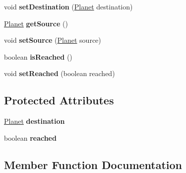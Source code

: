 \begin{DoxyCompactItemize}
void {\bfseries set\+Destination} (\mbox{\hyperlink{classfr_1_1groupe40_1_1projet_1_1model_1_1planets_1_1_planet}{Planet}} destination)
\item 
\mbox{\label{classfr_1_1groupe40_1_1projet_1_1model_1_1ships_1_1_ship_a0bad8c1701c7a6bee319ae8671228d6f}} 
\mbox{\hyperlink{classfr_1_1groupe40_1_1projet_1_1model_1_1planets_1_1_planet}{Planet}} {\bfseries get\+Source} ()
\item 
\mbox{\label{classfr_1_1groupe40_1_1projet_1_1model_1_1ships_1_1_ship_aa48b0a9238306da4fcc27a37dfc50829}} 
void {\bfseries set\+Source} (\mbox{\hyperlink{classfr_1_1groupe40_1_1projet_1_1model_1_1planets_1_1_planet}{Planet}} source)
\item 
\mbox{\label{classfr_1_1groupe40_1_1projet_1_1model_1_1ships_1_1_ship_a81d13eda5cf767c710e6d82407172d47}} 
boolean {\bfseries is\+Reached} ()
\item 
\mbox{\label{classfr_1_1groupe40_1_1projet_1_1model_1_1ships_1_1_ship_a5a3e2ba94e01cce27b168365e53e0cde}} 
void {\bfseries set\+Reached} (boolean reached)
\end{DoxyCompactItemize}
\subsection*{Protected Attributes}
\begin{DoxyCompactItemize}
\item 
\mbox{\label{classfr_1_1groupe40_1_1projet_1_1model_1_1ships_1_1_ship_a19eb504f8a0c0e263aff1e85e5e7557a}} 
\mbox{\hyperlink{classfr_1_1groupe40_1_1projet_1_1model_1_1planets_1_1_planet}{Planet}} {\bfseries destination}
\item 
\mbox{\label{classfr_1_1groupe40_1_1projet_1_1model_1_1ships_1_1_ship_abd5ae4da4bce134894098a111d7378c3}} 
boolean {\bfseries reached}
\end{DoxyCompactItemize}


\subsection{Member Function Documentation}
\mbox{\label{classfr_1_1groupe40_1_1projet_1_1model_1_1ships_1_1_ship_adfd10eb0bb2fe81b8612a9da7acc8148}} 
